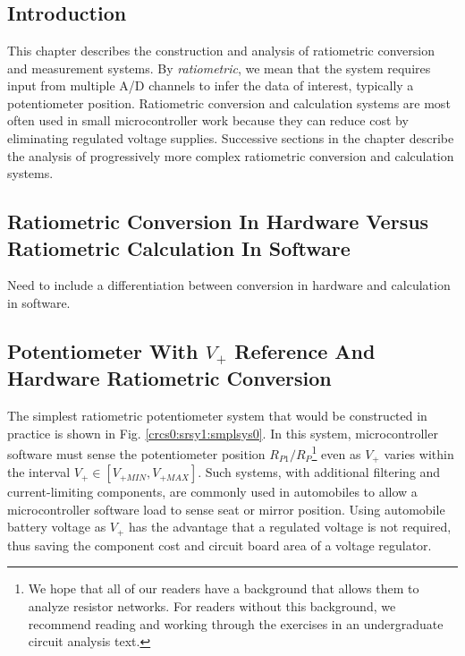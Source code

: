 \chapter[\crcszeroshorttitle{}]{\crcszerolongtitle{}}

\label{crcs0}


\section{Introduction}

This chapter describes the construction and analysis of ratiometric conversion and
measurement systems.  By \emph{ratiometric}, we mean that the system requires input
from multiple A/D channels to infer the data of interest, typically a potentiometer
position.  Ratiometric conversion and calculation systems are most often used in
small microcontroller work because they can reduce cost by eliminating regulated
voltage supplies.  Successive sections in the chapter describe the analysis of progressively
more complex ratiometric conversion and calculation systems.


\section{Ratiometric Conversion In Hardware Versus Ratiometric Calculation In Software}

Need to include a differentiation between conversion in hardware and
calculation in software.


%
\section{Potentiometer With $V_{+}$ Reference And Hardware Ratiometric Conversion}

The simplest ratiometric potentiometer system
that would be constructed in practice
is shown in Fig. \ref{crcs0:srsy1:smplsys0}.
In this system, microcontroller software must sense
the potentiometer position $R_{P1}/R_P$\footnote{We hope that
all of our readers have a background that allows them to
analyze resistor networks.  For readers without this background,
we recommend reading and working through the exercises in an
undergraduate circuit analysis text.} even as
$V_{+}$ varies within the interval
$V_{+} \in [V_{+MIN}, V_{+MAX}]$.  Such systems, with
additional filtering and current-limiting components,
are commonly used in automobiles to allow a microcontroller
software load to sense seat or
mirror position.
Using automobile battery voltage as $V_{+}$
has the advantage that a regulated voltage is not
required, thus saving the component cost and circuit board
area of a voltage regulator.

